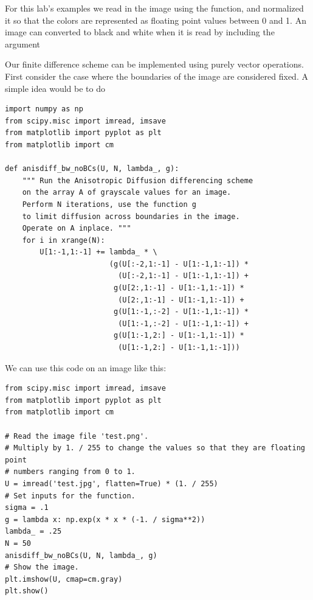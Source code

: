 For this lab's examples we read in the image using the  function, and normalized it so that the colors are represented as floating point values between 0 and 1.
An image can converted to black and white when it is read by including the argument 

Our finite difference scheme can be implemented using purely vector operations.
First consider the case where the boundaries of the image are considered fixed.
A simple idea would be to do 
\begin{lstlisting}
import numpy as np
from scipy.misc import imread, imsave
from matplotlib import pyplot as plt
from matplotlib import cm

def anisdiff_bw_noBCs(U, N, lambda_, g):
    """ Run the Anisotropic Diffusion differencing scheme
    on the array A of grayscale values for an image.
    Perform N iterations, use the function g
    to limit diffusion across boundaries in the image.
    Operate on A inplace. """
    for i in xrange(N):
        U[1:-1,1:-1] += lambda_ * \
                        (g(U[:-2,1:-1] - U[1:-1,1:-1]) *
                          (U[:-2,1:-1] - U[1:-1,1:-1]) +
                         g(U[2:,1:-1] - U[1:-1,1:-1]) *
                          (U[2:,1:-1] - U[1:-1,1:-1]) +
                         g(U[1:-1,:-2] - U[1:-1,1:-1]) *
                          (U[1:-1,:-2] - U[1:-1,1:-1]) +
                         g(U[1:-1,2:] - U[1:-1,1:-1]) *
                          (U[1:-1,2:] - U[1:-1,1:-1]))
\end{lstlisting}
We can use this code on an image like this:
\begin{lstlisting}
from scipy.misc import imread, imsave
from matplotlib import pyplot as plt
from matplotlib import cm

# Read the image file 'test.png'.
# Multiply by 1. / 255 to change the values so that they are floating point
# numbers ranging from 0 to 1.
U = imread('test.jpg', flatten=True) * (1. / 255)
# Set inputs for the function.
sigma = .1
g = lambda x: np.exp(x * x * (-1. / sigma**2))
lambda_ = .25
N = 50
anisdiff_bw_noBCs(U, N, lambda_, g)
# Show the image.
plt.imshow(U, cmap=cm.gray)
plt.show()
\end{lstlisting}

